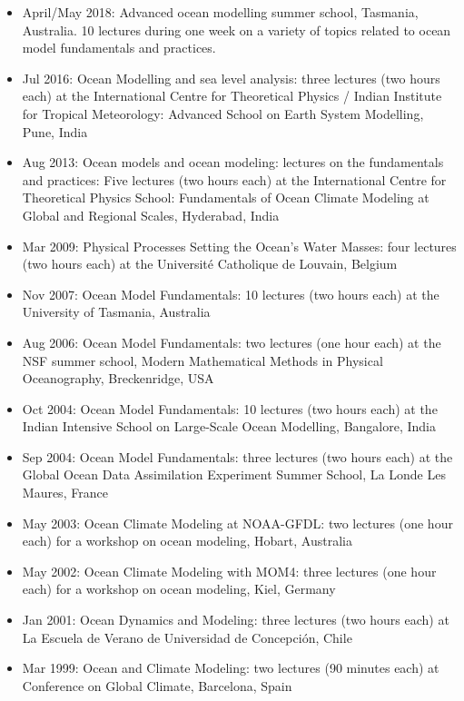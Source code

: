 \documentclass{article}
\begin{document}
\begin{itemize}[leftmargin=*]

\item April/May 2018: {\sc Advanced ocean modelling summer school}, Tasmania, Australia. 10 lectures during one week on a variety of topics related to ocean model fundamentals and practices.  

\item Jul 2016: {\sc Ocean Modelling and sea level analysis}: three
  lectures (two hours each) at the International Centre for
  Theoretical Physics / Indian Institute for Tropical Meteorology:
  {\sc Advanced School on Earth System Modelling}, Pune, India

\item Aug 2013: {\sc Ocean models and ocean modeling: lectures on the
    fundamentals and practices}: Five lectures (two hours each) at the
  International Centre for Theoretical Physics School: {\sc
    Fundamentals of Ocean Climate Modeling at Global and Regional
    Scales}, Hyderabad, India

\item Mar 2009: {\sc Physical Processes Setting the Ocean's Water
    Masses}: four lectures (two hours each) at the Universit\'e
  Catholique de Louvain, Belgium

\item Nov 2007: {\sc Ocean Model Fundamentals}:  10 lectures (two hours each)  
at the University of Tasmania, Australia

\item Aug 2006: {\sc Ocean Model Fundamentals}: two lectures (one hour
  each) at the NSF summer school, {\sc Modern Mathematical Methods in
    Physical Oceanography}, Breckenridge, USA

\item Oct 2004: {\sc Ocean Model Fundamentals}: 10 lectures (two hours
  each) at the {\sc Indian Intensive School on Large-Scale Ocean Modelling},
  Bangalore, India

\item Sep 2004: {\sc Ocean Model Fundamentals}: three lectures (two
  hours each) at the {\sc Global Ocean Data Assimilation Experiment
    Summer School}, La Londe Les Maures, France

\item May 2003: {\sc Ocean Climate Modeling at NOAA-GFDL}: two
  lectures (one hour each) for a workshop on ocean modeling, Hobart,
  Australia

\item May 2002: {\sc Ocean Climate Modeling with MOM4}: three lectures
  (one hour each) for a workshop on ocean modeling, Kiel, Germany

\item Jan 2001: {\sc Ocean Dynamics and Modeling}: three lectures (two
  hours each) at La Escuela de Verano de Universidad de Concepci\'on,
  Chile

\item Mar 1999: {\sc Ocean and Climate Modeling}: two lectures (90
  minutes each) at {\sc Conference on Global Climate}, Barcelona,
  Spain

\end{itemize}
\end{document}
